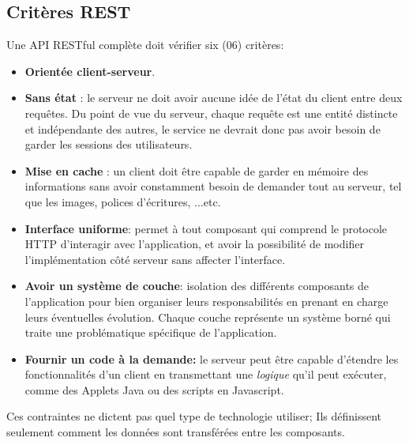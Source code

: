\newpage
\subsection{Critères REST}
Une API RESTful complète doit vérifier six (06) critères: \cite{refTutorialPointsREST}
\begin{itemize}
	\item \textbf{Orientée client-serveur}.
	      
	\item \textbf{Sans état} : le serveur ne doit avoir aucune idée de l'état du client entre deux requêtes. Du point de vue du serveur, chaque requête est une entité distincte et indépendante des autres, le service ne devrait donc pas avoir besoin de garder les sessions des utilisateurs.
	      
	\item \textbf{Mise en cache} : un client doit être capable de garder en mémoire des informations sans avoir constamment besoin de demander tout au serveur, tel que les images, polices d'écritures, ...etc.
	      
	\item \textbf{Interface uniforme}: permet à tout composant qui comprend le protocole HTTP d'interagir avec l'application, et avoir la possibilité de modifier l'implémentation côté serveur sans affecter l'interface.
	      
	\item \textbf{Avoir un système de couche}: isolation des différents composants de l'application pour bien organiser leurs responsabilités en prenant en charge leurs éventuelles évolution. Chaque couche représente un système borné qui traite une problématique spécifique de l'application.
	      
	\item \textbf{Fournir un code à la demande: } le serveur peut être capable d'étendre les fonctionnalités d'un client en transmettant une \emph{logique} qu'il peut exécuter, comme des Applets Java ou des scripts en Javascript.
	      
\end{itemize}
Ces contraintes ne dictent pas quel type de technologie utiliser; Ils définissent seulement comment les données sont transférées entre les composants.

